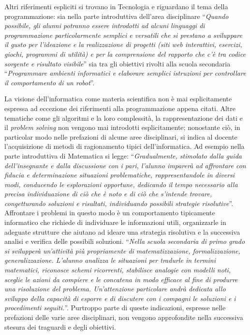 \documentclass[12pt]{report}
\begin{document}
Altri riferimenti espliciti si trovano in Tecnologia e riguardano il tema della programmazione: sia nella parte introduttiva dell'area disciplinare ``\textit{Quando possibile, gli alunni potranno essere introdotti ad alcuni linguaggi di programmazione particolarmente semplici e versatili che si prestano a sviluppare il gusto per l’ideazione e la realizzazione di progetti (siti web interattivi, esercizi, giochi, programmi di utilità) e per la comprensione del rapporto che c’è tra codice sorgente e risultato visibile}'' sia tra gli obiettivi rivolti alla scuola secondaria ``\textit{Programmare ambienti informatici e elaborare semplici istruzioni per controllare il comportamento di un robot}''.

La visione dell'informatica come materia scientifica non è mai esplicitamente espressa ad eccezione dei riferimenti alla programmazione appena citati. Altre tematiche come gli algoritmi e la loro complessità, la rappresentazione dei dati e il \textit{problem solving} non vengono mai introdotti esplicitamente; nonostante ciò, in particolar modo nelle prefazioni di alcune aree disciplinari, si indica al docente l'acquisizione di metodi di ragionamento tipici dell'informatica. 
Ad esempio nella parte introduttiva di Matematica si legge: ``\textit{Gradualmente, stimolato dalla guida dell'insegnante e dalla discussione con i pari, l’alunno imparerà ad affrontare con fiducia e determinazione situazioni problematiche, rappresentandole in diversi modi, conducendo le esplorazioni opportune, dedicando il tempo necessario alla precisa individuazione di ciò che è noto e di ciò che s’intende trovare, congetturando soluzioni e risultati, individuando possibili strategie risolutive}''.
Affrontare i problemi in questo modo è un comportamento tipicamente informatico che richiede di individuare le informazioni utili, organizzarle in adeguate strutture che aiutano ad ideare una strategia risolutiva e la successiva analisi e verifica delle possibili soluzioni. 
``\textit{Nella scuola secondaria di primo grado si svilupperà un’attività più propriamente di matematizzazione, formalizzazione, generalizzazione. L’alunno analizza le situazioni per tradurle in termini matematici, riconosce schemi ricorrenti, stabilisce analogie con modelli noti, sceglie le azioni da compiere e le concatena in modo efficace al fine di produrre una risoluzione del problema. Un’attenzione particolare andrà dedicata allo sviluppo della capacità di esporre e di discutere con i compagni le soluzioni e i procedimenti seguiti.}''. 
Purtroppo parte di queste indicazioni, espresse nelle prefazioni delle varie aree disciplinari, non vengono approfondite nella successiva stesura dei traguardi e degli obiettivi.
\end{document}
